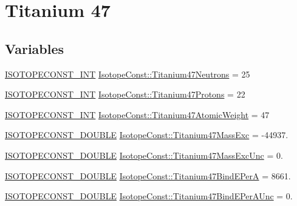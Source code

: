 \hypertarget{group___isotope_const-_titanium-_ti47}{}\section{Titanium 47}
\label{group___isotope_const-_titanium-_ti47}
\subsection*{Variables}
\begin{DoxyCompactItemize}
\item 
\mbox{\hyperlink{group___isotope_const-_macros_ga5f18360b3e99483a35c32d789e62621c}{I\+S\+O\+T\+O\+P\+E\+C\+O\+N\+S\+T\+\_\+\+I\+NT}} \mbox{\hyperlink{group___isotope_const-_titanium-_ti47_ga0802466937a5255ebe11105ea5799ef0}{Isotope\+Const\+::\+Titanium47\+Neutrons}} = 25
\item 
\mbox{\hyperlink{group___isotope_const-_macros_ga5f18360b3e99483a35c32d789e62621c}{I\+S\+O\+T\+O\+P\+E\+C\+O\+N\+S\+T\+\_\+\+I\+NT}} \mbox{\hyperlink{group___isotope_const-_titanium-_ti47_gafe93a3e017fdf521b8ca6e14fe1a51ab}{Isotope\+Const\+::\+Titanium47\+Protons}} = 22
\item 
\mbox{\hyperlink{group___isotope_const-_macros_ga5f18360b3e99483a35c32d789e62621c}{I\+S\+O\+T\+O\+P\+E\+C\+O\+N\+S\+T\+\_\+\+I\+NT}} \mbox{\hyperlink{group___isotope_const-_titanium-_ti47_ga9ce5b20f72bd38b91f9e597b7a16f6a1}{Isotope\+Const\+::\+Titanium47\+Atomic\+Weight}} = 47
\item 
\mbox{\hyperlink{group___isotope_const-_macros_ga8f45a7272ce02c0b4c65c44636ed719a}{I\+S\+O\+T\+O\+P\+E\+C\+O\+N\+S\+T\+\_\+\+D\+O\+U\+B\+LE}} \mbox{\hyperlink{group___isotope_const-_titanium-_ti47_ga6be4515adbde6772e2348bed0486747d}{Isotope\+Const\+::\+Titanium47\+Mass\+Exc}} = -\/44937.
\item 
\mbox{\hyperlink{group___isotope_const-_macros_ga8f45a7272ce02c0b4c65c44636ed719a}{I\+S\+O\+T\+O\+P\+E\+C\+O\+N\+S\+T\+\_\+\+D\+O\+U\+B\+LE}} \mbox{\hyperlink{group___isotope_const-_titanium-_ti47_gacce52625868726a7d434812f0b3177d0}{Isotope\+Const\+::\+Titanium47\+Mass\+Exc\+Unc}} = 0.
\item 
\mbox{\hyperlink{group___isotope_const-_macros_ga8f45a7272ce02c0b4c65c44636ed719a}{I\+S\+O\+T\+O\+P\+E\+C\+O\+N\+S\+T\+\_\+\+D\+O\+U\+B\+LE}} \mbox{\hyperlink{group___isotope_const-_titanium-_ti47_ga000bf42573dd654342bb30da95d0cc1c}{Isotope\+Const\+::\+Titanium47\+Bind\+E\+PerA}} = 8661.
\item 
\mbox{\hyperlink{group___isotope_const-_macros_ga8f45a7272ce02c0b4c65c44636ed719a}{I\+S\+O\+T\+O\+P\+E\+C\+O\+N\+S\+T\+\_\+\+D\+O\+U\+B\+LE}} \mbox{\hyperlink{group___isotope_const-_titanium-_ti47_ga42241d63bfccbbf56d6bf328d08d91c0}{Isotope\+Const\+::\+Titanium47\+Bind\+E\+Per\+A\+Unc}} = 0.

\end{DoxyCompactItemize}
